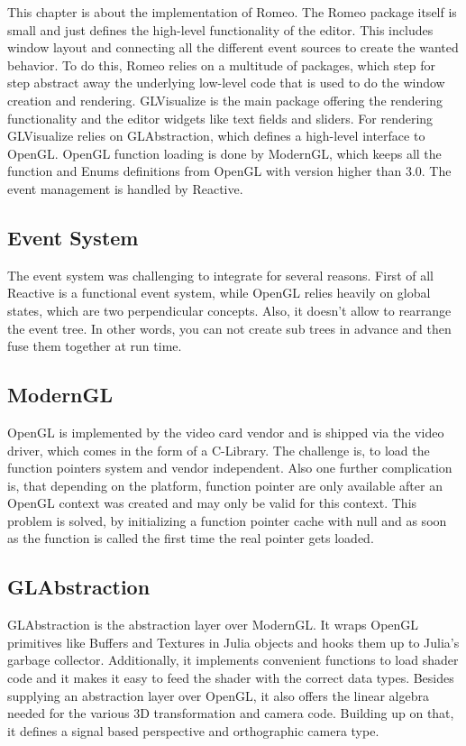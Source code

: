 This chapter is about the implementation of Romeo.
The Romeo package itself is small and just defines the high-level functionality of the editor.
This includes window layout and connecting all the different event sources to create the wanted behavior.
To do this, Romeo relies on a multitude of packages, which step for step abstract away the underlying low-level code that is used to do the window creation and rendering.
GLVisualize is the main package offering the rendering functionality and the editor widgets like text fields and sliders.
For rendering GLVisualize relies on GLAbstraction, which defines a high-level interface to \ac{OpenGL}.
\ac{OpenGL} function loading is done by ModernGL, which keeps all the function and Enums definitions from \ac{OpenGL} with version higher than 3.0.
The event management is handled by Reactive.

\subsection{Event System}

The event system was challenging to integrate for several reasons.
First of all Reactive is a functional event system, while \ac{OpenGL} relies heavily on global states, which are two perpendicular concepts.
Also, it doesn't allow to rearrange the event tree. 
In other words, you can not create sub trees in advance and then fuse them together at run time.

\subsection{ModernGL}
\ac{OpenGL} is implemented by the video card vendor and is shipped via the video driver, which comes in the form of a C-Library.
The challenge is, to load the function pointers system and vendor independent. 
Also one further complication is, that depending on the platform, function pointer are only available after an \ac{OpenGL} context was created and may only be valid for this context. \cite{wgl}
This problem is solved, by initializing a function pointer cache with null and as soon as the function is called the first time the real pointer gets loaded.



\subsection{GLAbstraction}
GLAbstraction is the abstraction layer over ModernGL.
It wraps \ac{OpenGL} primitives like Buffers and Textures in Julia objects and hooks them up to Julia's garbage collector.
Additionally, it implements convenient functions to load shader code and it makes it easy to feed the shader with the correct data types.
Besides supplying an abstraction layer over \ac{OpenGL}, it also offers the linear algebra needed for the various 3D transformation and camera code.
Building up on that, it defines a signal based perspective and orthographic camera type.


